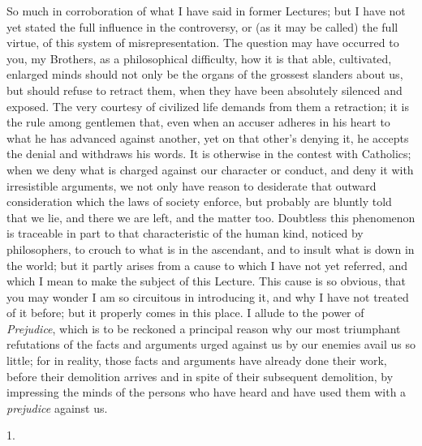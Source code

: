 So much in corroboration of what I have said in former
Lectures; but I have not yet stated the full influence in
the controversy, or (as it may be called) the full
virtue, of this system of misrepresentation. The question
may have occurred to you, my Brothers, as a philosophical
difficulty, how it is that able, cultivated, enlarged
minds should not only be the organs of the grossest
slanders about us, but should refuse to retract them,
when they have been absolutely silenced and exposed. The
very courtesy of civilized life demands from them a
retraction; it is the rule among gentlemen that, even
when an accuser adheres in his heart to what he has
advanced against another, yet on that other's denying it,
he accepts the denial and withdraws his words. It is
otherwise in the contest with Catholics; when we deny
what is charged against our character or conduct, and
deny it with irresistible arguments, we not only have
reason to desiderate that outward consideration which the
laws of society enforce, but probably are bluntly told
that we lie, and there we are left, and the matter too.
Doubtless this phenomenon is traceable in part to that characteristic of the human kind, noticed by
philosophers, to crouch to what is in the ascendant, and
to insult what is down in the world; but it partly arises
from a cause to which I have not yet referred, and which
I mean to make the subject of this Lecture. This cause is
so obvious, that you may wonder I am so circuitous in
introducing it, and why I have not treated of it before;
but it properly comes in this place. I allude to the
power of \emph{Prejudice}, which is to be reckoned a
principal reason why our most triumphant refutations of
the facts and arguments urged against us by our enemies
avail us so little; for in reality, those facts and
arguments have already done their work, before their
demolition arrives and in spite of their subsequent
demolition, by impressing the minds of the persons who
have heard and have used them with a \emph{prejudice}
against us.

1.

